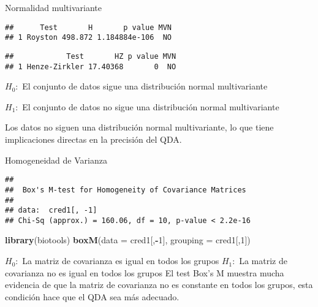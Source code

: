 \documentclass[ignorenonframetext,]{beamer}
\newenvironment{Shaded}{\begin{snugshade}}{\end{snugshade}}
\newcommand{\KeywordTok}[1]{\textcolor[rgb]{0.13,0.29,0.53}{\textbf{#1}}}
\newcommand{\DataTypeTok}[1]{\textcolor[rgb]{0.13,0.29,0.53}{#1}}
\newcommand{\DecValTok}[1]{\textcolor[rgb]{0.00,0.00,0.81}{#1}}
\newcommand{\StringTok}[1]{\textcolor[rgb]{0.31,0.60,0.02}{#1}}
\newcommand{\OperatorTok}[1]{\textcolor[rgb]{0.81,0.36,0.00}{\textbf{#1}}}
\newcommand{\NormalTok}[1]{#1}
\begin{document}
\begin{frame}[fragile]{Normalidad multivariante}

\hypertarget{left}{}
\begin{verbatim}
##      Test       H       p value MVN
## 1 Royston 498.872 1.184884e-106  NO
\end{verbatim}

\begin{verbatim}
##            Test       HZ p value MVN
## 1 Henze-Zirkler 17.40368       0  NO
\end{verbatim}

\hypertarget{right}{}
\begin{Shaded}
\end{Shaded}

\(H_0:\) El conjunto de datos sigue una distribución normal
multivariante

\(H_1:\) El conjunto de datos no sigue una distribución normal
multivariante

Los datos no siguen una distribución normal multivariante, lo que tiene
implicaciones directas en la precisión del QDA.

\end{frame}

\begin{frame}[fragile]{Homogeneidad de Varianza}

\hypertarget{left}{}
\begin{verbatim}
## 
##  Box's M-test for Homogeneity of Covariance Matrices
## 
## data:  cred1[, -1]
## Chi-Sq (approx.) = 160.06, df = 10, p-value < 2.2e-16
\end{verbatim}

\hypertarget{right}{}
\begin{Shaded}
\begin{Highlighting}[]
\KeywordTok{library}\NormalTok{(biotools)}
\KeywordTok{boxM}\NormalTok{(}\DataTypeTok{data =}\NormalTok{ cred1[,}\OperatorTok{-}\DecValTok{1}\NormalTok{], }\DataTypeTok{grouping =}\NormalTok{ cred1[,}\DecValTok{1}\NormalTok{])}
\end{Highlighting}
\end{Shaded}

\(H_0:\) La matriz de covarianza es igual en todos los grupos \(H_1:\)
La matriz de covarianza no es igual en todos los grupos El test Box's M
muestra mucha evidencia de que la matriz de covarianza no es constante
en todos los grupos, esta condición hace que el QDA sea más adecuado.

\end{frame}
\end{document}
